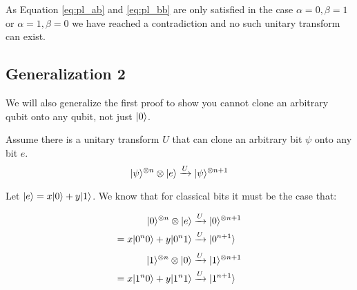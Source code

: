 As Equation \ref{eq:pl_ab} and \ref{eq:pl_bb} are only satisfied in the case $\alpha=0, \beta=1$ or $\alpha=1, \beta=0$ we have reached a contradiction and no such unitary transform can exist.


\subsection{Generalization 2}
We will also generalize the first proof to show you cannot clone an arbitrary qubit onto any qubit, not just $\lvert0\rangle$. 

Assume there is a unitary transform $U$ that can clone an arbitrary bit $\psi$ onto any bit $e$.
\begin{equation}\label{eq:def_c}
\lvert\psi\rangle^{\otimes n} \otimes \lvert e\rangle \xrightarrow{U} \lvert\psi\rangle^{\otimes n+1}
\end{equation}

Let $\lvert e\rangle = x\lvert0\rangle + y\lvert1\rangle$. 
We know that for classical bits it must be the case that:

\begin{align}
    \lvert0\rangle^{\otimes n} \otimes \lvert e\rangle &\xrightarrow{U} \lvert0\rangle^{\otimes n+1}\\
    =x\lvert0^n0\rangle + y\lvert0^n1\rangle &\xrightarrow{U} \lvert0^ {n+1}\rangle \label{eq:lin_ac}
\end{align}
\begin{align}
    \lvert1\rangle^{\otimes n} \otimes \lvert0\rangle &\xrightarrow{U} \lvert1\rangle^{\otimes n+1}\\
    =x\lvert1^n0\rangle + y\lvert1^n1\rangle&\xrightarrow{U} \lvert1^ {n+1}\rangle \label{eq:lin_bc}
\end{align}

